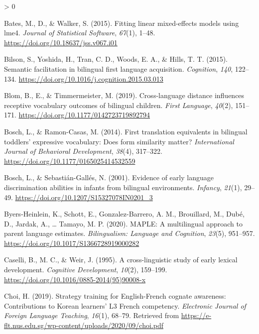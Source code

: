 \documentclass[
  english,
  ,man,floatsintext]{apa6}
\newlength{\cslhangindent}
\newenvironment{CSLReferences}[2] %
 {%
  \setlength{\parindent}{0pt}
  \ifodd #1 \everypar{\setlength{\hangindent}{\cslhangindent}}\ignorespaces\fi
  \ifnum #2 > 0
  \setlength{\parskip}{#2\baselineskip}
  \fi
 }%
 {}
\begin{document}
\hypertarget{refs}{}
\begin{CSLReferences}{1}{0}
\leavevmode\hypertarget{ref-Bates_etal_2015}{}%
Bates, M., D., \& Walker, S. (2015). Fitting linear mixed-effects models using lme4. \emph{Journal of Statistical Software}, \emph{67}(1), 1--48. \url{https://doi.org/10.18637/jss.v067.i01}

\leavevmode\hypertarget{ref-Bilson_etal_2015}{}%
Bilson, S., Yoshida, H., Tran, C. D., Woods, E. A., \& Hills, T. T. (2015). Semantic facilitation in bilingual first language acquisition. \emph{Cognition}, \emph{140}, 122--134. \url{https://doi.org/10.1016/j.cognition.2015.03.013}

\leavevmode\hypertarget{ref-Blom_etal_2019}{}%
Blom, B., E., \& Timmermeister, M. (2019). Cross-language distance influences receptive vocabulary outcomes of bilingual children. \emph{First Language}, \emph{40}(2), 151--171. \url{https://doi.org/10.1177/0142723719892794}

\leavevmode\hypertarget{ref-Bosch_Ramon-Casas_2014}{}%
Bosch, L., \& Ramon-Casas, M. (2014). First translation equivalents in bilingual toddlers' expressive vocabulary: Does form similarity matter? \emph{International Journal of Behavioral Development}, \emph{38}(4), 317--322. \url{https://doi.org/10.1177/0165025414532559}

\leavevmode\hypertarget{ref-Bosch_Sebastian-Galles_2001}{}%
Bosch, L., \& Sebastián-Gallés, N. (2001). Evidence of early language discrimination abilities in infants from bilingual environments. \emph{Infancy}, \emph{21}(1), 29--49. \url{https://doi.org/10.1207/S15327078IN0201_3}

\leavevmode\hypertarget{ref-Byers-Heinlein_etal_2020}{}%
Byers-Heinlein, K., Schott, E., Gonzalez-Barrero, A. M., Brouillard, M., Dubé, D., Jardak, A., \ldots{} Tamayo, M. P. (2020). MAPLE: A multilingual approach to parent language estimates. \emph{Bilingualism: Language and Cognition}, \emph{23}(5), 951--957. \url{https://doi.org/10.1017/S1366728919000282}

\leavevmode\hypertarget{ref-Caselli_etal_1995}{}%
Caselli, B., M. C., \& Weir, J. (1995). A cross-linguistic study of early lexical development. \emph{Cognitive Development}, \emph{10}(2), 159--199. \url{https://doi.org/10.1016/0885-2014(95)90008-x}

\leavevmode\hypertarget{ref-Choi_2019}{}%
Choi, H. (2019). Strategy training for {E}nglish-{F}rench cognate awareness: Contributions to {K}orean learners' L3 {F}rench competency. \emph{Electronic Journal of Foreign Language Teaching}, \emph{16}(1), 68--79. Retrieved from \url{https://e-flt.nus.edu.sg/wp-content/uploads/2020/09/choi.pdf}


\end{CSLReferences}
\end{document}
